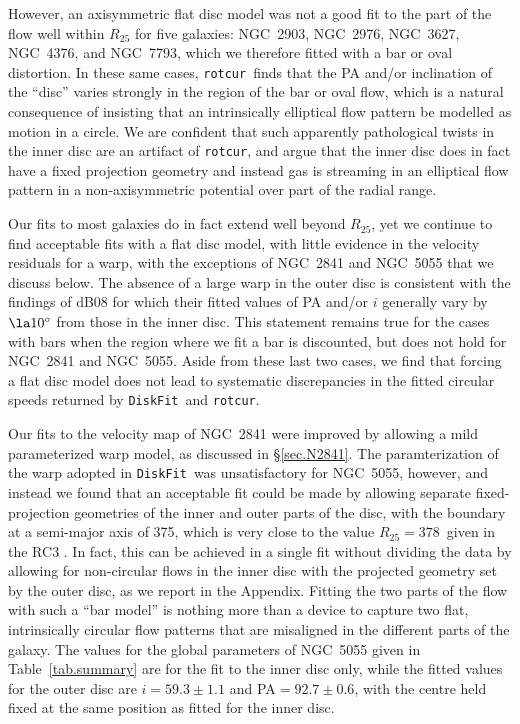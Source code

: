 \documentclass[letterpaper,fleqn,usenatbib]{mnras}
\def\DFt{{\tt DiskFit}}
\def\rtc{{\tt rotcur}}
\begin{document}
However, an axisymmetric flat disc model was not a good fit to the
part of the flow well within $R_{25}$ for five galaxies: NGC~2903,
NGC~2976, NGC~3627, NGC~4376, and NGC~7793, which we therefore fitted
with a bar or oval distortion.  In these same cases, \rtc\ finds that
the PA and/or inclination of the ``disc'' varies strongly in the
region of the bar or oval flow, which is a natural consequence of
insisting that an intrinsically elliptical flow pattern be modelled as
motion in a circle.  We are confident that such apparently
pathological twists in the inner disc are an artifact of \rtc, and
argue that the inner disc does in fact have a fixed projection
geometry and instead gas is streaming in an elliptical flow pattern in
a non-axisymmetric potential over part of the radial range.

Our fits to most galaxies do in fact extend well beyond $R_{25}$, yet
we continue to find acceptable fits with a flat disc model, with
little evidence in the velocity residuals for a warp, with the
exceptions of NGC~2841 and NGC~5055 that we discuss below.  The
absence of a large warp in the outer disc is consistent with the
findings of dB08 for which their fitted values of PA and/or $i$
generally vary by $\la 10^\circ$ from those in the inner disc.  This
statement remains true for the cases with bars when the region where
we fit a bar is discounted, but does not hold for NGC~2841 and
NGC~5055.  Aside from these last two cases, we find that forcing a
flat disc model does not lead to systematic discrepancies in the
fitted circular speeds returned by \DFt\ and \rtc.

Our fits to the velocity map of NGC~2841 were improved by allowing a
mild parameterized warp model, as discussed in \S\ref{sec.N2841}.  The
paramterization of the warp adopted in \DFt\ was unsatisfactory for
NGC~5055, however, and instead we found that an acceptable fit could
be made by allowing separate fixed-projection geometries of the inner
and outer parts of the disc, with the boundary at a semi-major axis of
375\arcsec, which is very close to the value $R_{25}=
378$\arcsec\ given in the RC3 \citep{dVCB}.  In fact, this can be
achieved in a single fit without dividing the data by allowing for
non-circular flows in the inner disc with the projected geometry set
by the outer disc, as we report in the Appendix.  Fitting the two
parts of the flow with such a ``bar model'' is nothing more than a
device to capture two flat, intrinsically circular flow patterns that
are misaligned in the different parts of the galaxy.  The values for
the global parameters of NGC~5055 given in Table~\ref{tab.summary} are
for the fit to the inner disc only, while the fitted values for the
outer disc are $i = 59.3\pm1.1$ and PA$ = 92.7\pm0.6$, with the centre
held fixed at the same position as fitted for the inner disc.
\end{document}
